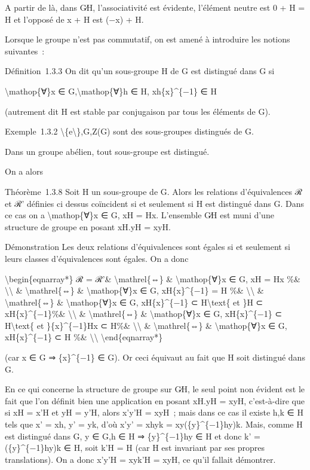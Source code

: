 \documentclass[]{article}
\begin{document}
A partir de là, dans G∕H, l'associativité est évidente, l'élément neutre
est 0 + H = H et l'opposé de x + H est (−x) + H.

Lorsque le groupe n'est pas commutatif, on est amené à introduire les
notions suivantes~:

Définition~1.3.3 On dit qu'un sous-groupe H de G est distingué dans G si

\textbackslash{}mathop\{∀\}x ∈ G,\textbackslash{}mathop\{∀\}h ∈ H,
xh\{x\}\^{}\{−1\} ∈ H

(autrement dit H est stable par conjugaison par tous les éléments de G).

Exemple~1.3.2 \textbackslash{}\{e\textbackslash{}\},G,Z(G) sont des
sous-groupes distingués de G.

Dans un groupe abélien, tout sous-groupe est distingué.

On a alors

Théorème~1.3.8 Soit H un sous-groupe de G. Alors les relations
d'équivalences ℛ et ℛ' définies ci dessus coïncident si et seulement si
H est distingué dans G. Dans ce cas on a \textbackslash{}mathop\{∀\}x ∈
G, xH = Hx. L'ensemble G∕H est muni d'une structure de groupe en posant
xH.yH = xyH.

Démonstration Les deux relations d'équivalences sont égales si et
seulement si leurs classes d'équivalences sont égales. On a donc

\textbackslash{}begin\{eqnarray*\} ℛ = ℛ'\& \textbackslash{}mathrel\{⇔\}
\& \textbackslash{}mathop\{∀\}x ∈ G, xH = Hx \%\&
\textbackslash{}\textbackslash{} \& \textbackslash{}mathrel\{⇔\} \&
\textbackslash{}mathop\{∀\}x ∈ G, xH\{x\}\^{}\{−1\} = H \%\&
\textbackslash{}\textbackslash{} \& \textbackslash{}mathrel\{⇔\} \&
\textbackslash{}mathop\{∀\}x ∈ G, xH\{x\}\^{}\{−1\} ⊂
H\textbackslash{}text\{ et \}H ⊂ xH\{x\}\^{}\{−1\}\%\&
\textbackslash{}\textbackslash{} \& \textbackslash{}mathrel\{⇔\} \&
\textbackslash{}mathop\{∀\}x ∈ G, xH\{x\}\^{}\{−1\} ⊂
H\textbackslash{}text\{ et \}\{x\}\^{}\{−1\}Hx ⊂ H\%\&
\textbackslash{}\textbackslash{} \& \textbackslash{}mathrel\{⇔\} \&
\textbackslash{}mathop\{∀\}x ∈ G, xH\{x\}\^{}\{−1\} ⊂ H \%\&
\textbackslash{}\textbackslash{} \textbackslash{}end\{eqnarray*\}

(car x ∈ G ⇒ \{x\}\^{}\{−1\} ∈ G). Or ceci équivaut au fait que H soit
distingué dans G.

En ce qui concerne la structure de groupe sur G∕H, le seul point non
évident est le fait que l'on définit bien une application en posant
xH.yH = xyH, c'est-à-dire que si xH = x'H et yH = y'H, alors x'y'H =
xyH~; mais dans ce cas il existe h,k ∈ H tels que x' = xh, y' = yk, d'où
x'y' = xhyk = xy(\{y\}\^{}\{−1\}hy)k. Mais, comme H est distingué dans
G, y ∈ G,h ∈ H ⇒ \{y\}\^{}\{−1\}hy ∈ H et donc k' = (\{y\}\^{}\{−1\}hy)k
∈ H, soit k'H = H (car H est invariant par ses propres translations). On
a donc x'y'H = xyk'H = xyH, ce qu'il fallait démontrer.
\end{document}
